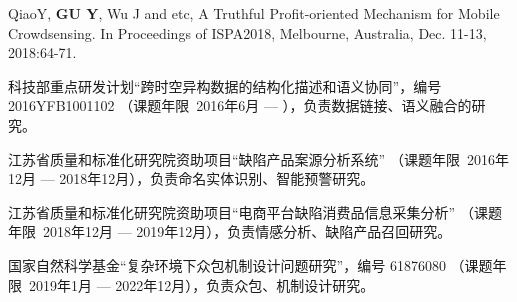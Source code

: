 \documentclass[winfonts,master,oneside,nobackinfo]{njuthesis}
\begin{document}
\backmatter
\begin{resume}
\begin{publications}
\item QiaoY, \textbf{GU Y}, Wu J and etc, A Truthful Profit-oriented Mechanism for Mobile Crowdsensing. In Proceedings of ISPA2018, Melbourne, Australia, Dec. 11-13, 2018:64-71.
\end{publications}
\begin{projects}
\item 	科技部重点研发计划“跨时空异构数据的结构化描述和语义协同”，编号2016YFB1001102
（课题年限~2016年6月 --- ），负责数据链接、语义融合的研究。
\item 江苏省质量和标准化研究院资助项目``缺陷产品案源分析系统''
（课题年限~2016年12月 --- 2018年12月），负责命名实体识别、智能预警研究。
\item 江苏省质量和标准化研究院资助项目``电商平台缺陷消费品信息采集分析''
（课题年限~2018年12月 --- 2019年12月），负责情感分析、缺陷产品召回研究。
\item 国家自然科学基金``复杂环境下众包机制设计问题研究''，编号	61876080
（课题年限~2019年1月 --- 2022年12月），负责众包、机制设计研究。
\end{projects}
\end{resume}


\end{document}
